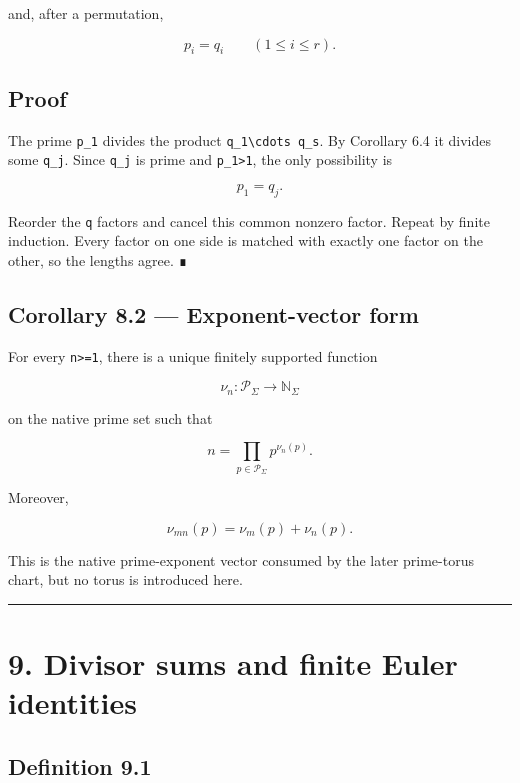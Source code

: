 and, after a permutation,

\[
p_i=q_i
\qquad(1\le i\le r).
\]

\hypertarget{proof-9}{%
\subsection{Proof}\label{proof-9}}

The prime \texttt{p\_1} divides the product \texttt{q\_1\textbackslash{}cdots\ q\_s}. By Corollary 6.4 it divides
some \texttt{q\_j}. Since \texttt{q\_j} is prime and \texttt{p\_1\textgreater{}1}, the only possibility is

\[
p_1=q_j.
\]

Reorder the \texttt{q} factors and cancel this common nonzero factor. Repeat by finite
induction. Every factor on one side is matched with exactly one factor on the
other, so the lengths agree. ∎

\hypertarget{corollary-8.2-exponent-vector-form}{%
\subsection{Corollary 8.2 --- Exponent-vector form}\label{corollary-8.2-exponent-vector-form}}

For every \texttt{n\textgreater{}=1}, there is a unique finitely supported function

\[
\nu_n:\mathcal P_\Sigma\to\mathbb N_\Sigma
\]

on the native prime set such that

\[
\boxed{
n=\prod_{p\in\mathcal P_\Sigma}p^{\nu_n(p)}.}
\]

Moreover,

\[
\boxed{
\nu_{mn}(p)=\nu_m(p)+\nu_n(p).
}
\]

This is the native prime-exponent vector consumed by the later prime-torus
chart, but no torus is introduced here.

\begin{center}\rule{0.5\linewidth}{0.5pt}\end{center}

\hypertarget{divisor-sums-and-finite-euler-identities}{%
\section{9. Divisor sums and finite Euler identities}\label{divisor-sums-and-finite-euler-identities}}

\hypertarget{definition-9.1}{%
\subsection{Definition 9.1}\label{definition-9.1}}

